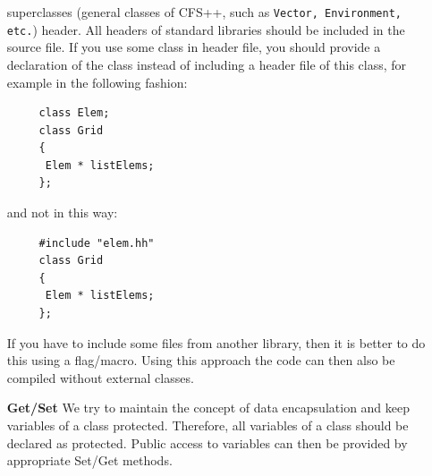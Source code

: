 \documentclass{article}
\begin{document}
\begin{enumerate}
     superclasses (general classes of CFS++, such as \texttt{Vector,
     Environment, etc.}) header. All headers of standard libraries should be
     included in the source file. If you use some class in header file, you
     should provide a declaration of the class instead of including a header
     file of this class, for example in the following fashion:
     \begin{verbatim}
     class Elem;
     class Grid
     {
      Elem * listElems;
     };
     \end{verbatim}
     and not in this way:
     \begin{verbatim}
     #include "elem.hh"
     class Grid
     {
      Elem * listElems;
     };
     \end{verbatim} 
     If you have to include some files from another library, then it is better
     to do this using a flag/macro. Using this approach the code can then also
     be compiled without external classes. 
\item[\textbf{Get/Set}] We try to maintain the concept of data encapsulation and
     keep variables of a class protected. Therefore, all variables of a class
     should be declared as protected. Public access to variables can then be
     provided by appropriate Set/Get methods.
\end{enumerate}
\end{document}
